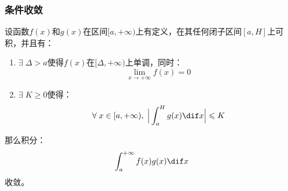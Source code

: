 \subsubsection{条件收敛}
\begin{theorem}[Dirichlet判别法]
	设函数$f(x)$和$g(x)$在区间$[a,+\infty)$上有定义，在其任何闭子区间$[a,H]$上可积，并且有：
	\begin{enumerate}
		\item $\exists\;\Delta>a$使得$f(x)$在$[\Delta,+\infty)$上单调，同时：
		\begin{equation*}
			\lim_{x\to+\infty}f(x)=0
		\end{equation*}
		\item $\exists\;K\geqslant0$使得：
		\begin{equation*}
			\forall\;x\in[a,+\infty),\;\Big|\int_{a}^{H}g(x)\dif x\Big|\leqslant K
		\end{equation*}
	\end{enumerate}
	那么积分：
	\begin{equation*}
		\int_{a}^{+\infty}f(x)g(x)\dif x
	\end{equation*}
	收敛。
\end{theorem}
